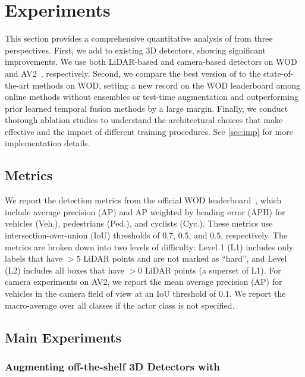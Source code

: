 % 

\chapter{Experiments}
\label{sec:experiments}

This section provides a comprehensive quantitative analysis of \ourmodel{}
from three perspectives. 
First, we add \ourmodel{} to existing 3D detectors, showing significant improvements. We use both LiDAR-based and camera-based detectors on WOD~\cite{WOD} and AV2~\cite{wilson2023argoverse}, respectively.
Second, we compare the best version of \ourmodel{} to the state-of-the-art methods on WOD, setting a new record on the WOD leaderboard among online methods without ensembles or test-time augmentation and outperforming prior learned temporal fusion methods by a large margin.
Finally, we conduct thorough ablation studies to understand the architectural choices that make \ourmodel{} effective and the impact of different training procedures.
See \cref{sec:imp} for more implementation details.


\section{Metrics}
\label{sec:metrics}

We report the detection metrics from the official WOD leaderboard~\cite{WOD},
which include average precision (AP) and AP weighted
by heading error (APH) for vehicles (Veh.), pedestrians (Ped.), and cyclists (Cyc.).
These metrics use intersection-over-union (IoU) thresholds
of 0.7, 0.5, and 0.5, respectively.
The metrics are broken down into two levels of difficulty:
Level 1 (L1) includes only labels that have $> 5$ LiDAR points
and are not marked as ``hard'',
and Level (L2) includes all boxes that have $> 0$ LiDAR points (a superset of L1).
For camera experiments on AV2, we report the mean average precision (AP) for vehicles in the camera field of view at an IoU threshold of 0.1.
We report the macro-average over all classes if the actor class is not specified.


\section{Main Experiments}
\label{sec:main-exp}

\subsection{Augmenting off-the-shelf 3D Detectors with \ourmodel{}}
\label{sec:aug}

